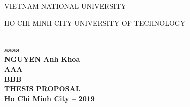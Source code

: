 \begin{titlepage}
    \vspace*{-0.7cm}
    \begin{center}
        \begin{minipage}{0.45\textwidth}
            \begin{flushleft}
                VIETNAM NATIONAL UNIVERSITY
            \end{flushleft}
        \end{minipage}
        \begin{minipage}{0.45\textwidth}
            \begin{flushright}
                HO CHI MINH CITY UNIVERSITY OF TECHNOLOGY
            \end{flushright}
        \end{minipage}
        \\[0.03cm]
        {\bfseries aaaa }\\[4.4cm]

        {\large \bfseries NGUYEN Anh Khoa}\\[2.7cm]


        { \bfseries \large AAA \\[0.0cm] BBB }\\[2.4cm]
        {\bfseries THESIS PROPOSAL }\\[8cm]


        {\bfseries Ho Chi Minh City -- 2019}
    \end{center}
\end{titlepage}
